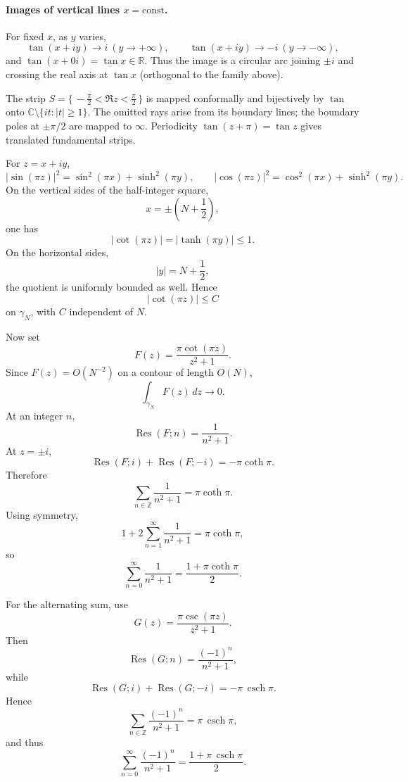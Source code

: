 \begin{problem}[CP-IV-0137]
\medskip
\paragraph{Images of vertical lines $x=\text{const}$.}
For fixed $x$, as $y$ varies,
\[
\tan(x+iy)\to i \ (y\to+\infty),\qquad \tan(x+iy)\to -i \ (y\to-\infty),
\]
and $\tan(x+0i)=\tan x\in\mathbb R$. Thus the image is a circular arc joining $\pm i$ and crossing the real axis at $\tan x$ (orthogonal to the family above).

\medskip

The strip $S=\{\, -\tfrac{\pi}{2}<\Re z<\tfrac{\pi}{2}\,\}$ is mapped conformally and bijectively by $\tan$ onto $\mathbb C\setminus\{it:|t|\ge1\}$. The omitted rays arise from its boundary lines; the boundary poles at $\pm\pi/2$ are mapped to $\infty$. Periodicity $\tan(z+\pi)=\tan z$ gives translated fundamental strips.
\end{problem}



\begin{solution}
For \(z=x+iy\),
\[
|\sin(\pi z)|^2
=
\sin^2(\pi x)+\sinh^2(\pi y),
\qquad
|\cos(\pi z)|^2
=
\cos^2(\pi x)+\sinh^2(\pi y).
\]
On the vertical sides of the half-integer square,
\[
x=\pm\left(N+\frac12\right),
\]
one has
\[
|\cot(\pi z)|=|\tanh(\pi y)|\le1.
\]
On the horizontal sides,
\[
|y|=N+\frac12,
\]
the quotient is uniformly bounded as well. Hence
\[
|\cot(\pi z)|\le C
\]
on \(\gamma_N\), with \(C\) independent of \(N\).

Now set
\[
F(z)=\frac{\pi\cot(\pi z)}{z^2+1}.
\]
Since \(F(z)=O(N^{-2})\) on a contour of length \(O(N)\),
\[
\int_{\gamma_N}F(z)\,dz\longrightarrow0.
\]
At an integer \(n\),
\[
\operatorname{Res}(F;n)=\frac1{n^2+1}.
\]
At \(z=\pm i\),
\[
\operatorname{Res}(F;i)+\operatorname{Res}(F;-i)
=
-\pi\coth\pi.
\]
Therefore
\[
\sum_{n\in\mathbb Z}\frac1{n^2+1}
=
\pi\coth\pi.
\]
Using symmetry,
\[
1+2\sum_{n=1}^{\infty}\frac1{n^2+1}
=
\pi\coth\pi,
\]
so
\[
\boxed{
\sum_{n=0}^{\infty}\frac1{n^2+1}
=
\frac{1+\pi\coth\pi}{2}.
}
\]

For the alternating sum, use
\[
G(z)=\frac{\pi\csc(\pi z)}{z^2+1}.
\]
Then
\[
\operatorname{Res}(G;n)
=
\frac{(-1)^n}{n^2+1},
\]
while
\[
\operatorname{Res}(G;i)+\operatorname{Res}(G;-i)
=
-\pi\,\operatorname{csch}\pi.
\]
Hence
\[
\sum_{n\in\mathbb Z}\frac{(-1)^n}{n^2+1}
=
\pi\,\operatorname{csch}\pi,
\]
and thus
\[
\boxed{
\sum_{n=0}^{\infty}
\frac{(-1)^n}{n^2+1}
=
\frac{1+\pi\,\operatorname{csch}\pi}{2}.
}
\]
\end{solution}


